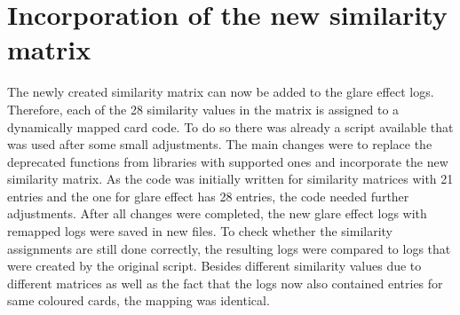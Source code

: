 \newpage

\section{Incorporation of the new similarity matrix}
\label{incorporation_of_the_new_similarity_matrix}
The newly created similarity matrix can now be added to the glare effect logs. Therefore, each of the 28 similarity values in the matrix is assigned to a dynamically mapped card code. To do so there was already a script available that was used after some small adjustments. The main changes were to replace the deprecated functions from libraries with supported ones and incorporate the new similarity matrix. As the code was initially written for similarity matrices with 21 entries and the one for glare effect has 28 entries, the code needed further adjustments. After all changes were completed, the new glare effect logs with remapped logs were saved in new files. To check whether the similarity assignments are still done correctly, the resulting logs were compared to logs that were created by the original script. Besides different similarity values due to different matrices as well as the fact that the logs now also contained entries for same coloured cards, the mapping was identical. 


